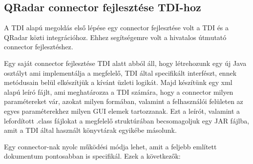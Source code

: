  
\subsection{QRadar connector fejlesztése TDI-hoz}\label{subsec:connimpl}

A TDI alapú megoldás első lépése egy connector fejlesztése volt a TDI és a QRadar közti integrációhoz. Ehhez segítségemre volt a hivatalos útmutató connector fejlesztéshez. \cite{conndev} 

Egy saját connector fejlesztése TDI alatt abból áll, hogy létrehozunk egy új Java osztályt ami implementálja a megfelelő, TDI által specifikált interfészt, ennek metódusain belül elkészítjük a kívánt üzleti logikát. Majd készítünk egy xml alapú leíró fájlt, ami meghatározza a TDI számára, hogy a connector milyen paramétereket vár, azokat milyen formában, valamint a felhasználói felületen az egyes paraméterekhez milyen GUI elemek tartozzanak. Ezt a leírót, valamint a lefordított .class fájlokat a megfelelő struktúrában becsomagoljuk egy JAR fájlba, amit a TDI által használt könyvtárak egyikébe másolunk. 

Egy connector-nak nyolc működési módja lehet, amit a feljebb említett dokumentum pontosabban is specifikál. Ezek a következők:


